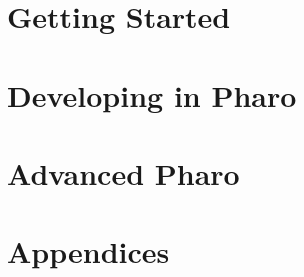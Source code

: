 \documentclass[a4paper,10pt,twoside]{book}
\begin{document}
\part{Getting Started}




\part{Developing in Pharo}








\part{Advanced Pharo}


\appendix
\part{Appendices}



{\small\raggedright\printindex}
\cleardoublepage
~ %
\cleardoublepage
~ %
\cleardoublepage
\end{document}
